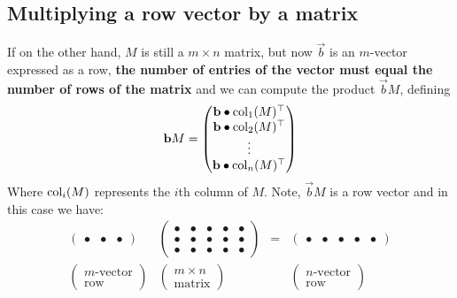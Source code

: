 \documentclass{ximera}
\begin{document}
\subsection{Multiplying a row vector by a matrix}
If on the other hand, $M$ is still a $m\times n$ matrix, but now
$\vec{b}$ is an $m$-vector expressed as a row, \textbf{the number of
  entries of the vector must equal the number of rows of the matrix}
and we can compute the product $\vec{b}M$, defining
\[
\mathbf{b} M =
\begin{pmatrix}
  \mathbf{b}\bullet \operatorname{col}_1(M)^\top \\
  \mathbf{b}\bullet \operatorname{col}_2(M)^\top \\
  \vdots \\
  \mathbf{b}\bullet \operatorname{col}_n(M)^\top
\end{pmatrix}
\]
Where $\operatorname{col}_i(M)$ represents the $i$th column of $M$. Note, $\vec{b}M$ is a row vector and in this case we have:
\[
\begin{matrix}
\begin{pmatrix}
  \bullet & \bullet & \bullet
\end{pmatrix}
&
\begin{pmatrix}
  \bullet & \bullet & \bullet & \bullet & \bullet \\
  \bullet & \bullet & \bullet & \bullet & \bullet \\
  \bullet & \bullet & \bullet & \bullet & \bullet
\end{pmatrix}
&
=
&
\begin{pmatrix}
  \bullet & \bullet & \bullet & \bullet & \bullet
\end{pmatrix}
\\
\begin{pmatrix}
  m\text{-vector}\\
  \text{row}
\end{pmatrix}
&
\begin{pmatrix}
  m\times n\\
  \text{matrix}
\end{pmatrix}
& &
\begin{pmatrix}
  n\text{-vector}\\
  \text{row}
\end{pmatrix}
\end{matrix}
\]
\end{document}
